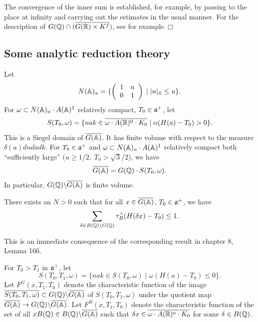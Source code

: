 The convergence of the inner sum is established, for example, by passing to
the place at infinity and carrying out the estimates in the usual manner.
For the description of
$G({\Bbb{Q}})\cap (\overline{G({\Bbb{R}})\times K^f})$,
see \cite{K2} for example.$\Box $

\subsection{Some analytic reduction theory}

Let 
\[
N({\Bbb{A}})_u=\{\left( 
\begin{array}{cc}
1 & n \\ 
0 & 1
\end{array}
\right) \;|\;|n|_{{\Bbb{A}}}\leq u\}. 
\]
For $\omega \subset N({\Bbb{A}})_u\cdot A({\Bbb{A}})^1$
relatively compact, $T_0\in {\frak{a}}^{+}$, let 
\[
S(T_0,\omega )=
\{nak\in \overline{\omega \cdot A({\Bbb{R}})^0\cdot K_0}
\;|\;\alpha (H(a)-T_0)>0\}. 
\]
This is a Siegel domain of $\overline{G({\Bbb{A}})}$. It has finite volume
with respect to the measure $\delta (a)dndadk$. For $T_0\in {\frak{a}}^{+}$
and $\omega \subset N({\Bbb{A}})_u\cdot A({\Bbb{A}})^1$ relatively
compact both
``sufficiently large'' ($u\geq 1/2,\;T_0>\sqrt{3}/2$), we have 
\[
\overline{G({\Bbb{A}})}=G({\Bbb{Q}})\cdot S(T_0,\omega ). 
\]
In particular, $G({\Bbb{Q}})\backslash \overline{G({\Bbb{A}})}$ is
finite volume.

\begin{lemma}
There exists an $N>0$ such that for all $x\in \overline{G({\Bbb{A}})}$,
$T_0\in {\frak{a}}^{+}$, we have 
\[
\sum_{\delta \in B({\Bbb{Q}})\backslash G({\Bbb{Q}})}
\tau _B^{\wedge }(H(\delta x)-T_0)\leq 1.
\]
\end{lemma}

This is an immediate consequence of the corresponding result in
chapter 8, Lemma 166.

For $T_0>T_1$ in ${\frak{a}}^{+}$, let 
\[
S(T_0,T_1,\omega )=\{nak\in S(T_0,\omega )\;|\;\omega (H(a)-T_0)\leq 0\}. 
\]
Let $F^G(x,T_1,T_0)$ denote the characteristic function of the image
$\overline{S(T_0,T_1,\omega )}\subset
G({\Bbb{Q}})\backslash \overline{G({\Bbb{A}})}$ of
$S(T_0,T_1,\omega )$ under the quotient map
$\overline{G({\Bbb{A}})}\rightarrow
G({\Bbb{Q}})\backslash \overline{G({\Bbb{A}})}$. Let
$F^B(x,T_1,T_0)$
denote the characteristic function of the set of all
$xB({\Bbb{Q}})\in B({\Bbb{Q}})\backslash \overline{G({\Bbb{A}})}$ such
that $\delta x\in \overline{\omega \cdot A({\Bbb{R}})^o\cdot K_0}$
for some $\delta \in B({\Bbb{Q}})$.

